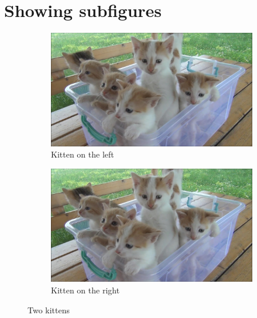 \documentclass{article}%
\begin{document}
%
\normalsize%
\section{Showing subfigures}%


\begin{figure}[h!]%
\begin{subfigure}[b]{0.45\linewidth}%
\includegraphics[width=\linewidth]{kitten.jpg}%
\caption{Kitten on the left}%
\end{subfigure}%
\begin{subfigure}[b]{0.45\linewidth}%
\includegraphics[width=\linewidth]{kitten.jpg}%
\caption{Kitten on the right}%
\end{subfigure}%
\caption{Two kittens}%
\end{figure}

%
\end{document}
